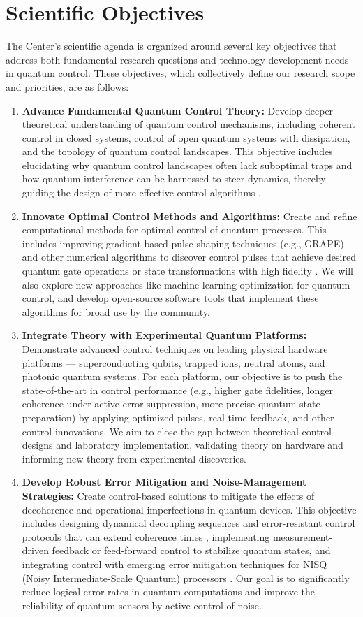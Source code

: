 \documentclass[11pt]{article}
\begin{document}
\section{Scientific Objectives}
The Center's scientific agenda is organized around several key objectives that address both fundamental research questions and technology development needs in quantum control. These objectives, which collectively define our research scope and priorities, are as follows:
\begin{enumerate}
   \item \textbf{Advance Fundamental Quantum Control Theory:} Develop deeper theoretical understanding of quantum control mechanisms, including coherent control in closed systems, control of open quantum systems with dissipation, and the topology of quantum control landscapes. This objective includes elucidating why quantum control landscapes often lack suboptimal traps and how quantum interference can be harnessed to steer dynamics, thereby guiding the design of more effective control algorithms \cite{Rabitz07,Brif10}.
   \item \textbf{Innovate Optimal Control Methods and Algorithms:} Create and refine computational methods for optimal control of quantum processes. This includes improving gradient-based pulse shaping techniques (e.g., GRAPE) and other numerical algorithms to discover control pulses that achieve desired quantum gate operations or state transformations with high fidelity \cite{Khaneja05}. We will also explore new approaches like machine learning optimization for quantum control, and develop open-source software tools that implement these algorithms for broad use by the community.
   \item \textbf{Integrate Theory with Experimental Quantum Platforms:} Demonstrate advanced control techniques on leading physical hardware platforms --- superconducting qubits, trapped ions, neutral atoms, and photonic quantum systems. For each platform, our objective is to push the state-of-the-art in control performance (e.g., higher gate fidelities, longer coherence under active error suppression, more precise quantum state preparation) by applying optimized pulses, real-time feedback, and other control innovations. We aim to close the gap between theoretical control designs and laboratory implementation, validating theory on hardware and informing new theory from experimental discoveries.
   \item \textbf{Develop Robust Error Mitigation and Noise-Management Strategies:} Create control-based solutions to mitigate the effects of decoherence and operational imperfections in quantum devices. This objective includes designing dynamical decoupling sequences and error-resistant control protocols that can extend coherence times \cite{Viola99}, implementing measurement-driven feedback or feed-forward control to stabilize quantum states, and integrating control with emerging error mitigation techniques for NISQ (Noisy Intermediate-Scale Quantum) processors \cite{Cai23}. Our goal is to significantly reduce logical error rates in quantum computations and improve the reliability of quantum sensors by active control of noise.

\end{enumerate}
\end{document}
